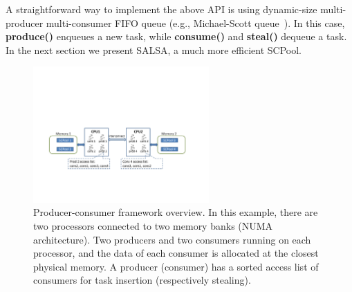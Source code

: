 A straightforward way to implement the above API is using dynamic-size multi-producer multi-consumer FIFO queue (e.g., Michael-Scott queue~\cite{Michael:1996:SFP:248052.248106}).
In this case, {\bf produce()} enqueues a new task, while {\bf consume()} and {\bf steal()} dequeue a task. In the next section we present SALSA, a much more efficient SCPool.


\begin{figure}[htb]
	\centering
	\includegraphics[width=0.6\textwidth]{figures/system-fig}
	\caption{\footnotesize{Producer-consumer framework overview. In this example, there are two processors connected to two memory banks (NUMA architecture). Two producers and two consumers running on each processor, and the data of each consumer is allocated at the closest physical memory. A producer (consumer) has a sorted access list of consumers for task insertion (respectively stealing). }}
	\label{fig:system-fig}
\end{figure}

